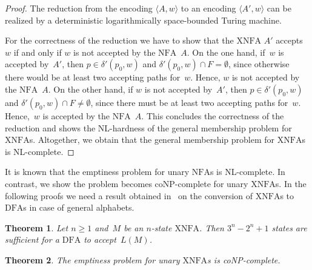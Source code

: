 \documentclass[final,copyright,noderivs]{eptcs}
\theoremstyle{plain}
\newtheorem{theorem}{Theorem}
\theoremstyle{definition}
\newcommand{\dfa}{\textrm{DFA}}
\newcommand{\nfa}{\textrm{NFA}}
\newcommand{\xnfa}{\textrm{XNFA}}
\begin{document}
\begin{proof}
The reduction from the encoding $\langle A,w \rangle$ to an encoding $\langle A',w \rangle$
can be realized by a deterministic logarithmically space-bounded Turing machine. 

For the correctness of the reduction we have to show that
the $\xnfa$ $A'$ accepts~$w$ if and only if $w$ is not accepted by the $\nfa$~$A$.
On the one hand, if~$w$ is accepted by~$A'$, then $p \in \delta'(p_0,w)$ and $\delta'(p_0,w) \cap F=\emptyset$,
since otherwise there would be at least two accepting paths for~$w$. Hence, $w$ is not
accepted by the $\nfa$~$A$.
On the other hand, if $w$ is not accepted by~$A'$, then $p \in \delta'(p_0,w)$ and 
$\delta'(p_0,w) \cap F \neq \emptyset$, since there must be at least two accepting paths for~$w$.
Hence,~$w$ is accepted by the $\nfa$~$A$.
This concludes the correctness of the reduction and shows the \textsf{NL}-hardness of
the general membership problem for $\xnfa$s. Altogether, we obtain that the
general membership problem for $\xnfa$s is \textsf{NL}-complete.
\end{proof}

It is known that the emptiness problem for unary $\nfa$s is {\sf NL}-complete. In contrast,
we show the problem becomes {\sf coNP}-complete for unary $\xnfa$s. In the following proofs we need a result
obtained in~\cite{kutrib:2023:coenfa:proc,kutrib:2023:coenfa} on the conversion of $\xnfa$s to $\dfa$s
in case of general alphabets.

\begin{theorem}\label{theo:xnfatodfa:upper}\cite{kutrib:2023:coenfa:proc,kutrib:2023:coenfa}
Let $n\geq 1$ and~$M$ be an $n$-state $\xnfa$.
Then $3^n-2^n+1$ states are sufficient for a $\dfa$ to accept~$L(M)$. 
\end{theorem}

\begin{theorem}\label{theo:compempty:unary} 
The emptiness problem for unary $\xnfa$s 
is {\em \textsf{coNP}}-complete.
\end{theorem}
\end{document}
